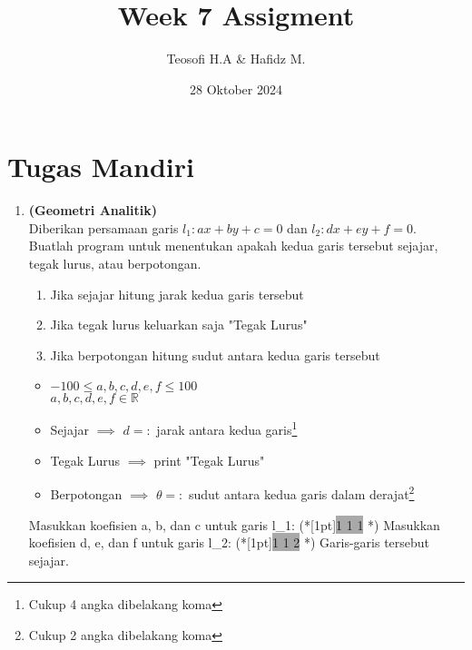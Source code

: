 \documentclass{article}
\title{\textbf{Week 7 Assigment}}
\date{28 Oktober 2024}
\author{Teosofi H.A \& Hafidz M.}
\newcommand{\enter}{\raisebox{-1.8pt}{\begin{tikzpicture}[scale=0.3]
    \draw[thin,fill=lightgray] (0,0) rectangle (2,1);
    \draw (0.3,0.3) -- (0.7,0.3)--(0.7,0.6);     
\end{tikzpicture}}}
\newcommand{\inputscan}[1]{\raisebox{0pt}[1pt]{\colorbox{darkgray}{#1}}}
\newcommand{\R}{\mathbb{R}}
\begin{document}
    \maketitle

    \section*{Tugas Mandiri}
    \begin{enumerate}[label=]
        \item \textbf{(Geometri Analitik)}\\
        Diberikan persamaan garis $l_1: ax + by + c = 0$ dan $l_2: dx + ey + f = 0$. Buatlah program untuk menentukan apakah kedua garis tersebut sejajar, tegak lurus, atau berpotongan. 
        \begin{enumerate}
            \item Jika sejajar hitung jarak kedua garis tersebut
            \item Jika tegak lurus keluarkan saja "Tegak Lurus"
            \item Jika berpotongan hitung sudut antara kedua garis tersebut
        \end{enumerate}
        \begin{req}
            \begin{itemize}
                \item $-100\leq a,b,c,d,e,f\leq 100$\\
                $a,b,c,d,e,f\in\R$
            \end{itemize}
        \end{req}
        \begin{out}
            \begin{itemize}
                \item Sejajar $\implies$ $d=:$ jarak antara kedua garis\footnote{Cukup 4 angka dibelakang koma}
                \item Tegak Lurus $\implies$ print "Tegak Lurus"
                \item Berpotongan $\implies$ $\theta=:$ sudut antara kedua garis dalam derajat\footnote{Cukup 2 angka dibelakang koma}
            \end{itemize}
        \end{out}
        \begin{RunCode}
Masukkan koefisien a, b, dan c untuk garis l_1: (*\inputscan{1 1 1} \enter*)
Masukkan koefisien d, e, dan f untuk garis l_2: (*\inputscan{1 1 2} \enter*)
Garis-garis tersebut sejajar.

\end{RunCode}
\end{enumerate}
\end{document}
